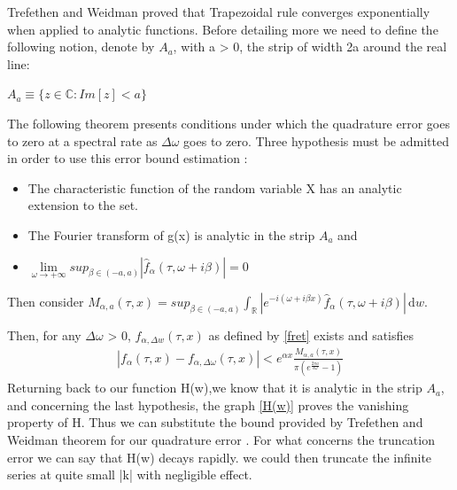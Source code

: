 \documentclass[12pt]{report}
\begin{document}
Trefethen and Weidman proved that Trapezoidal rule converges exponentially when applied to analytic functions.
Before detailing more we need to define the following notion, denote by $A_a$, with a > 0, the strip of width 2a around the real line:
\begin{center}
$A_a \equiv \{z \in \mathbb{C}: Im [z] < a\}$
\end{center}
The following theorem presents conditions under which the quadrature error goes to zero
at a spectral rate as $\Delta \omega$ goes to zero. Three hypothesis must be admitted in order to use this error bound estimation :
 \begin{itemize}
\item The characteristic function of the random variable X has an analytic extension
to the set.
\item The Fourier transform of g(x) is analytic in the strip $A_a$ and
\item $\lim\limits_{\omega \rightarrow +\infty} sup _{\beta \in (-a,a)} |\hat{f}_{\alpha}(\tau, \omega+i\beta)|=0$
\end{itemize}

Then consider $M_{\alpha, a}(\tau,x)=sup _{\beta \in (-a,a)} \int_\mathbb{R} | e^{-i(\omega+i\beta x)}\hat{f}_{\alpha}(\tau, \omega+i\beta) |\,
 \mathrm{d} w$.

Then, for any $\Delta \omega$ > 0, $f_{\alpha,\Delta w }(\tau,x)$ as defined by \eqref{fret} exists and satisfies
\begin{gather}
|f_{\alpha}(\tau,x)-f_{\alpha,\Delta \omega }(\tau,x)| < e^{\alpha x} \frac{M_{\alpha, a}(\tau,x)}{\pi(e^{\frac{2\pi a}{\delta \omega}}-1)}
\end{gather}
Returning back to our function H(w),we know that it is analytic in the strip $A_a$, and concerning the last hypothesis, the graph \eqref{H(w)} proves the vanishing property of H. Thus we can substitute the bound provided by Trefethen and Weidman theorem for our quadrature error .
For what concerns the truncation error we can say that H(w) decays rapidly. we could then truncate the infinite series at quite small |k| with negligible effect.
\end{document}
